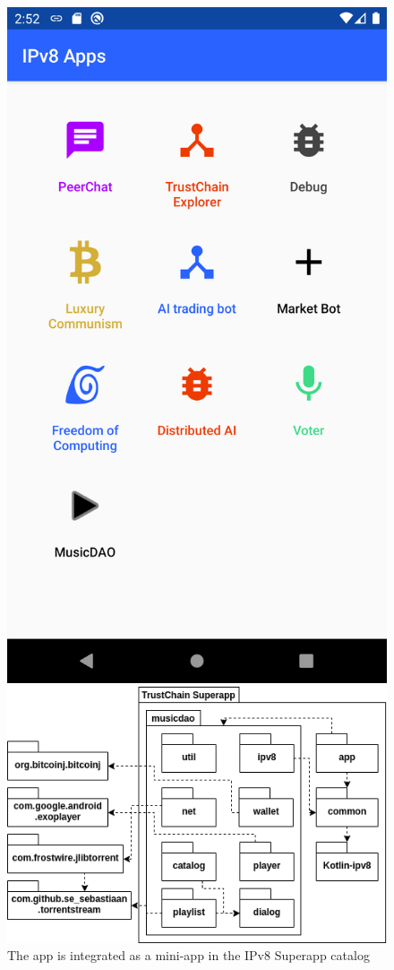 \begin{figure}
        \includegraphics[width=1\linewidth]{implementation/screenshot-superapp.png}
        \caption{The app is integrated as a mini-app in the IPv8 Superapp catalog}
        \label{fig:screenshot-superapp}
    \endminipage\hfill
        \includegraphics[width=1\linewidth]{implementation/package-diagram.png}

\end{figure}
